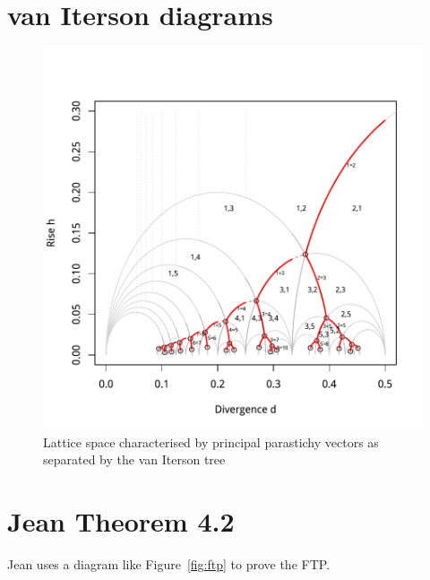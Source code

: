 \documentclass[a4paper]{article}
\begin{document}
\clearpage
\section{van Iterson diagrams}





\begin{center}
\begin{figure}[H]
\includegraphics{figdir/fig-jsvanIterson}
\caption{Lattice space characterised by principal parastichy vectors as separated by the van Iterson tree}
\end{figure}
\end{center}


\section{Jean Theorem 4.2}



Jean uses a diagram like Figure~\ref{fig:ftp} to prove the FTP.
\end{document}
